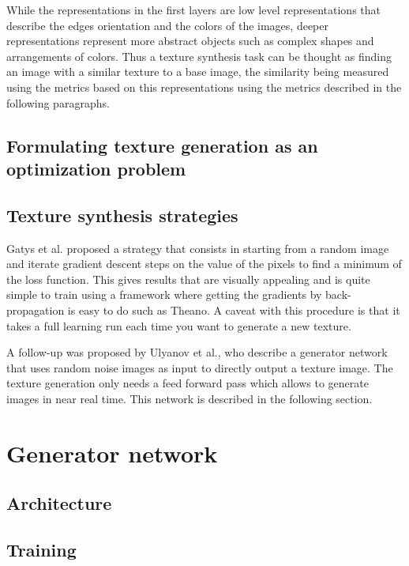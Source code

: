 \documentclass{article}
\begin{document}
While the representations in the first layers are low level representations that describe the edges orientation and the colors of the images, deeper representations represent more abstract objects such as complex shapes and arrangements of colors. Thus a texture synthesis task can be thought as finding an image with a similar texture to a base image, the similarity being measured using the metrics based on this representations using the metrics described in the following paragraphs.

\subsection{Formulating texture generation as an optimization problem}



\subsection{Texture synthesis strategies}

Gatys et al. proposed a strategy that consists in starting from a random image and iterate gradient descent steps on the value of the pixels to find a minimum of the loss function. This gives results that are visually appealing and is quite simple to train using a framework where getting the gradients by back-propagation is easy to do such as Theano. A caveat with this procedure is that it takes a full learning run each time you want to generate a new texture.

A follow-up was proposed by Ulyanov et al., who describe a generator network that uses random noise images as input to directly output a texture image. The texture generation only needs a feed forward pass which allows to generate images in near real time. This network is described in the following section.



\section{Generator network}

\subsection{Architecture}

\subsection{Training}
\end{document}

